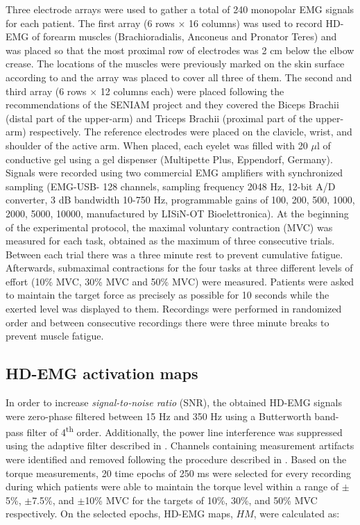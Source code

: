 Three electrode arrays were used to gather a total of 240 monopolar EMG signals for each patient. The first array (6 rows $\times$ 16 columns) was used to record HD-EMG of forearm muscles (Brachioradialis, Anconeus and Pronator Teres) and was placed so that the most proximal row of electrodes was 2 cm below the elbow crease. The locations of the muscles were previously marked on the skin surface according to \citep{Kendall1993} and the array was placed to cover all three of them. The second and third array (6 rows $\times$ 12 columns each) were placed following the recommendations of the SENIAM project \citep{Hermens1999} and they covered the Biceps Brachii (distal part of the upper-arm) and Triceps Brachii (proximal part of the upper-arm) respectively. The reference electrodes were placed on the clavicle, wrist, and shoulder of the active arm. When placed, each eyelet was filled with 20 $\mu$l of conductive gel using a gel dispenser (Multipette Plus, Eppendorf, Germany).
Signals were recorded using two commercial EMG amplifiers with synchronized sampling (EMG-USB- 128 channels, sampling frequency 2048 Hz, 12-bit A/D converter, 3 dB bandwidth 10-750 Hz, programmable gains of 100, 200, 500, 1000, 2000, 5000, 10000, manufactured by LISiN-OT Bioelettronica).
At the beginning of the experimental protocol, the maximal voluntary contraction (MVC) was measured for each task, obtained as the maximum of three consecutive trials. Between each trial there was a three minute rest to prevent cumulative fatigue.
Afterwards, submaximal contractions for the four tasks at three different levels of effort (10\% MVC, 30\% MVC and 50\% MVC) were measured. Patients were asked to maintain the target force as precisely as possible for 10 seconds while the exerted level was displayed to them. Recordings were performed in randomized order and between consecutive recordings there were three minute breaks to prevent muscle fatigue.


\subsection{HD-EMG activation maps}

In order to increase \emph{signal-to-noise ratio} (SNR), the obtained HD-EMG signals were zero-phase filtered between 15 Hz and 350 Hz using a Butterworth band-pass filter of 4\textsuperscript{th} order. Additionally, the power line interference was suppressed using the adaptive filter described in \citep{Mananas2001}. Channels containing measurement artifacts were identified and removed following the procedure described in \citep{Rojas-Martinez2012}.
Based on the torque measurements, 20 time epochs of 250 ms were selected for every recording during which patients were able to maintain the torque level within a range of $\pm$5\%, $\pm$7.5\%, and $\pm$10\% MVC for the targets of 10\%, 30\%, and 50\% MVC respectively. On the selected epochs, HD-EMG maps, $HM$, were calculated as:


